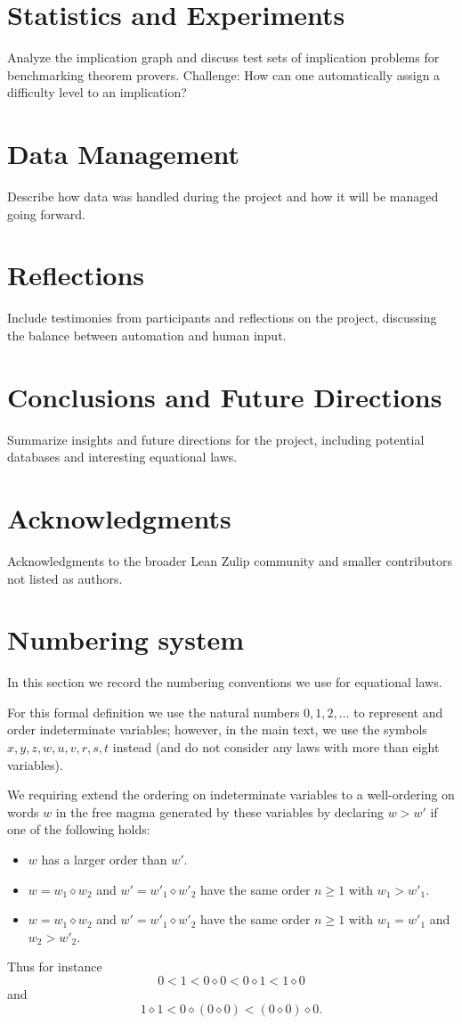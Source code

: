 \documentclass[12pt]{article}
\theoremstyle{definition}
\newcommand{\op}{\diamond}
\begin{document}
\section{Statistics and Experiments}
Analyze the implication graph and discuss test sets of implication problems for benchmarking theorem provers. Challenge: How can one automatically assign a difficulty level to an implication?

\section{Data Management}
Describe how data was handled during the project and how it will be managed going forward.

\section{Reflections}
Include testimonies from participants and reflections on the project, discussing the balance between automation and human input.

\section{Conclusions and Future Directions}
Summarize insights and future directions for the project, including potential databases and interesting equational laws.

\section*{Acknowledgments}
Acknowledgments to the broader Lean Zulip community and smaller contributors not listed as authors.

\appendix

\section{Numbering system}\label{numbering-app}

In this section we record the numbering conventions we use for equational laws.

For this formal definition we use the natural numbers $0,1,2,\dots$ to represent and order indeterminate variables; however, in the main text, we use the symbols $x,y,z,w,u,v,r,s,t$ instead (and do not consider any laws with more than eight variables).

We requiring extend the ordering on indeterminate variables to a well-ordering on words $w$ in the free magma generated by these variables by declaring $w > w'$ if one of the following holds:
\begin{itemize}
    \item $w$ has a larger order than $w'$.
    \item $w = w_1 \op w_2$ and $w' = w'_1 \op w'_2$ have the same order $n \geq 1$ with $w_1 > w'_1$.
    \item $w = w_1 \op w_2$ and $w' = w'_1 \op w'_2$ have the same order $n \geq 1$ with $w_1 = w'_1$ and $w_2 > w'_2$.
\end{itemize}
Thus for instance
$$ 0 < 1 < 0 \op 0 < 0 \op 1 < 1 \op 0 $$
and
$$ 1 \op 1 < 0 \op (0 \op 0) < (0 \op 0) \op 0.$$
\end{document}
